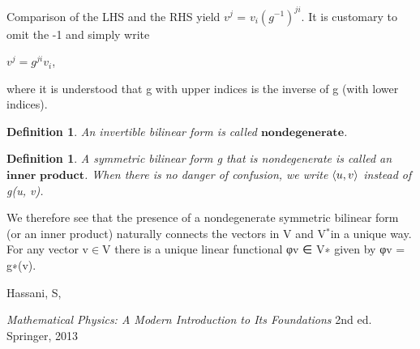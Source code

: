 \documentclass[12pt,a4paper]{article}
\newtheorem{defn}[thm]{Definition}
\begin{document}
\indent Comparison of the LHS and the RHS yield $v^j$ = $v_i(g^{-1})^{ji}$. It is customary
to omit the -1 and simply write \\
\begin{center}
$v^j = g ^ {ji} v_{i}$,
\end{center}
where it is understood that g with upper indices is the inverse of g (with
lower indices). \\
\begin{defn}
An invertible bilinear form is called $\textbf{nondegenerate}$.
\end{defn}
\begin{defn}
A symmetric bilinear form g that is nondegenerate is called an $\textbf{inner product}$. When there is no danger of confusion, we write $\braket{u, v}$ instead of g(u, v).
\end{defn}
We therefore see that the presence of a nondegenerate symmetric bilinear
form (or an inner product) naturally connects the vectors in V and V$^*$in a
unique way. For any vector v$\in$V there is a unique linear functional φv ∈ V∗
given by φv = g∗(v). 




\newpage
\begin{thebibliography}{9}

  Hassani, S,

  \emph{Mathematical Physics: A Modern Introduction to Its Foundations}  2nd ed. Springer, 2013



\end{thebibliography}
\end{document}
